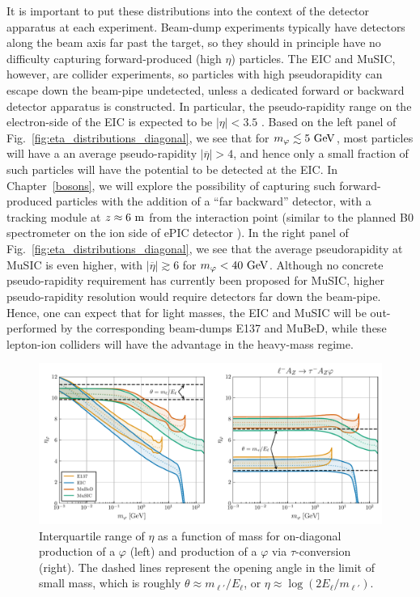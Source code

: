 It is important to put these distributions into the context of the detector apparatus at each experiment. Beam-dump experiments typically have detectors along the beam axis far past the target, so they should in principle have no difficulty capturing forward-produced (high $\eta$) particles. The EIC and MuSIC, however, are collider experiments, so particles with high pseudorapidity can escape down the beam-pipe undetected, unless a dedicated forward or backward detector apparatus is constructed. In particular, the pseudo-rapidity range on the electron-side of the EIC is expected to be $|\eta| < 3.5$ \cite{AbdulKhalek:2021gbh}. Based on the left panel of Fig.~\ref{fig:eta_distributions_diagonal}, we see that for $m_\varphi \lesssim 5~{\rm GeV}$, most particles will have a an average pseudo-rapidity $|\overline{\eta}| > 4$, and hence only a small fraction of such particles will have the potential to be detected at the EIC. In  Chapter~\ref{bosons}, we will explore the possibility of capturing such forward-produced particles with the addition of a ``far backward'' detector, with a tracking module at $z \approx 6~{\rm m}$ from the interaction point (similar to the planned B0 spectrometer on the ion side of ePIC detector \cite{Adkins:2022jfp}). In the right panel of Fig.~\ref{fig:eta_distributions_diagonal}, we see that the average pseudorapidity at MuSIC is even higher, with $|\overline{\eta}| \gtrsim 6$ for $m_\varphi < 40~{\rm GeV}$. Although no concrete pseudo-rapidity requirement has currently been proposed for MuSIC, higher pseudo-rapidity resolution would require detectors far down the beam-pipe. Hence, one can expect that for light masses, the EIC and MuSIC will be out-performed by the corresponding beam-dumps E137 and MuBeD, while these lepton-ion colliders will have the advantage in the heavy-mass regime.

\begin{figure}[t!]
    \centering
    \includegraphics[width=\linewidth]{figures/chapter4/median_eta.pdf}
    \caption[Interquartile range as a function of mass for pseudo-rapidity distributions of scalars produced at various lepton-nucleus collision experiments.]{Interquartile range of $\eta$ as a function of mass for on-diagonal production of a $\varphi$ (left) and production of a $\varphi$ via $\tau$-conversion (right). The dashed lines represent the opening angle in the limit of small mass, which is roughly $\theta \approx m_{\ell'}/E_\ell$, or $\eta \approx \log{(2E_\ell/m_{\ell'})}$.}
    \label{fig:pseudorapidity_IQR}
\end{figure}

